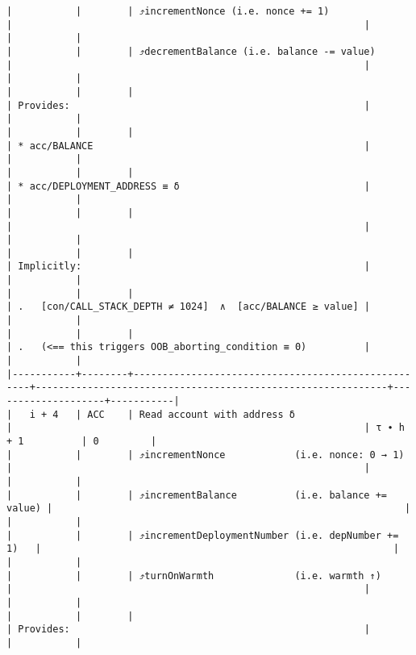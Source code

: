 \documentclass[varwidth=\maxdimen,margin=0.5cm,multi={verbatim}]{standalone}
\begin{document}
\begin{verbatim}
|           |        | ⤴️incrementNonce (i.e. nonce += 1)                  |                                                             |                    |           |
|           |        | ⤴️decrementBalance (i.e. balance -= value)          |                                                             |                    |           |
|           |        |                                                    | Provides:                                                   |                    |           |
|           |        |                                                    | * acc/BALANCE                                               |                    |           |
|           |        |                                                    | * acc/DEPLOYMENT_ADDRESS ≡ δ                                |                    |           |
|           |        |                                                    |                                                             |                    |           |
|           |        |                                                    | Implicitly:                                                 |                    |           |
|           |        |                                                    | .   [con/CALL_STACK_DEPTH ≠ 1024]  ∧  [acc/BALANCE ≥ value] |                    |           |
|           |        |                                                    | .   (<== this triggers OOB_aborting_condition ≡ 0)          |                    |           |
|-----------+--------+----------------------------------------------------+-------------------------------------------------------------+--------------------+-----------|
|   i + 4   | ACC    | Read account with address δ                        |                                                             | τ ∙ h + 1          | 0         |
|           |        | ⤴️incrementNonce            (i.e. nonce: 0 → 1)     |                                                             |                    |           |
|           |        | ⤴️incrementBalance          (i.e. balance += value) |                                                             |                    |           |
|           |        | ⤴️incrementDeploymentNumber (i.e. depNumber += 1)   |                                                             |                    |           |
|           |        | ⤴️turnOnWarmth              (i.e. warmth ↑)         |                                                             |                    |           |
|           |        |                                                    | Provides:                                                   |                    |           |

\end{verbatim}
\end{document}
